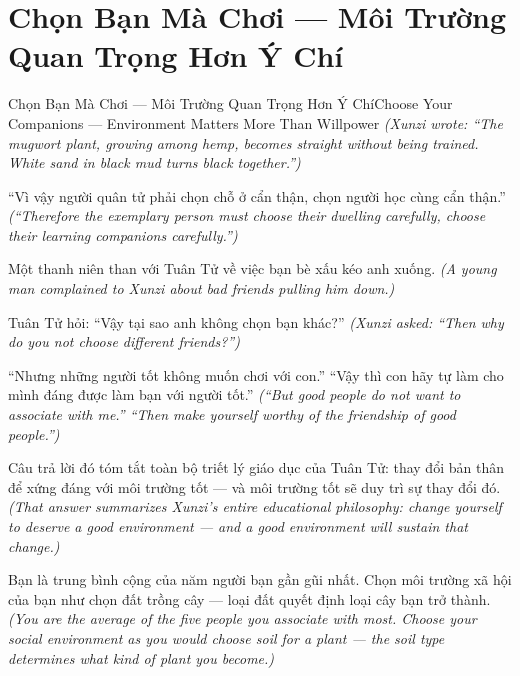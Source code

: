 \section{Chọn Bạn Mà Chơi — Môi Trường Quan Trọng Hơn Ý Chí}
\begin{truyen}{Chọn Bạn Mà Chơi — Môi Trường Quan Trọng Hơn Ý Chí}{Choose Your Companions — Environment Matters More Than Willpower}
\textit{(Xunzi wrote: ``The mugwort plant, growing among hemp, becomes straight without being trained. White sand in black mud turns black together.'')}

``Vì vậy người quân tử phải chọn chỗ ở cẩn thận, chọn người học cùng cẩn thận.''
\textit{(``Therefore the exemplary person must choose their dwelling carefully, choose their learning companions carefully.'')}

Một thanh niên than với Tuân Tử về việc bạn bè xấu kéo anh xuống.
\textit{(A young man complained to Xunzi about bad friends pulling him down.)}

Tuân Tử hỏi: ``Vậy tại sao anh không chọn bạn khác?''
\textit{(Xunzi asked: ``Then why do you not choose different friends?'')}

``Nhưng những người tốt không muốn chơi với con.'' ``Vậy thì con hãy tự làm cho mình đáng được làm bạn với người tốt.''
\textit{(``But good people do not want to associate with me.'' ``Then make yourself worthy of the friendship of good people.'')}

Câu trả lời đó tóm tắt toàn bộ triết lý giáo dục của Tuân Tử: thay đổi bản thân để xứng đáng với môi trường tốt — và môi trường tốt sẽ duy trì sự thay đổi đó.
\textit{(That answer summarizes Xunzi's entire educational philosophy: change yourself to deserve a good environment — and a good environment will sustain that change.)}

\end{truyen}

\begin{baihoc}
Bạn là trung bình cộng của năm người bạn gần gũi nhất. Chọn môi trường xã hội của bạn như chọn đất trồng cây — loại đất quyết định loại cây bạn trở thành.
\textit{(You are the average of the five people you associate with most. Choose your social environment as you would choose soil for a plant — the soil type determines what kind of plant you become.)}
\end{baihoc}
\ngancach

